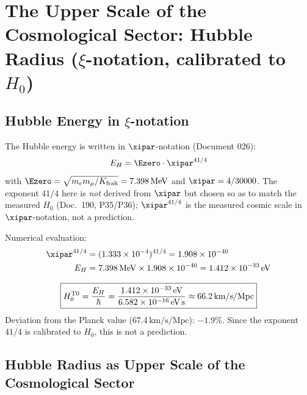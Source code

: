 \section{The Upper Scale of the Cosmological Sector: Hubble Radius (\texorpdfstring{$\xi$}{xi}-notation, calibrated to $H_0$)}

\subsection{Hubble Energy in \texorpdfstring{$\xi$}{xi}-notation}

The Hubble energy is written in $\xipar$-notation (Document 026):
\begin{equation}
	E_H = \Ezero \cdot \xipar^{41/4}
\end{equation}
with $\Ezero = \sqrt{m_e m_\mu/K_{\text{frak}}} = 7{.}398\,\text{MeV}$ and $\xipar = 4/30000$. The exponent $41/4$ here is \emph{not} derived from $\xipar$ but chosen so as to match the measured $H_0$ (Doc.~190, P35/P36); $\xipar^{41/4}$ is the measured cosmic scale in $\xipar$-notation, not a prediction.

Numerical evaluation:
\begin{align}
	\xipar^{41/4} &= (1{.}333 \times 10^{-4})^{41/4} = 1{.}908 \times 10^{-40} \\
	E_H &= 7{.}398\,\text{MeV} \times 1{.}908 \times 10^{-40} = 1{.}412 \times 10^{-33}\,\text{eV}
\end{align}

\begin{keyresult}
\begin{equation}
	\boxed{H_0^{\text{T0}} = \frac{E_H}{\hbar} = \frac{1{.}412 \times 10^{-33}\,\text{eV}}{6{.}582 \times 10^{-16}\,\text{eV\,s}} \approx 66{.}2\,\text{km/s/Mpc}}
\end{equation}
Deviation from the Planck value ($67{.}4\,\text{km/s/Mpc}$): $-1{.}9\%$. Since the exponent $41/4$ is calibrated to $H_0$, this is not a prediction.
\end{keyresult}

\subsection{Hubble Radius as Upper Scale of the Cosmological Sector}

